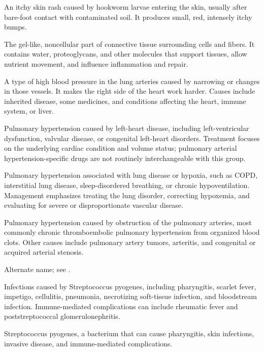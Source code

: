  An itchy skin rash caused by hookworm larvae entering the skin, usually after bare-foot contact with contaminated soil. It produces small, red, intensely itchy bumps.

 The gel-like, noncellular part of connective tissue surrounding cells and fibers. It contains water, proteoglycans, and other molecules that support tissues, allow nutrient movement, and influence inflammation and repair.

 A type of high blood pressure in the lung arteries caused by narrowing or changes in those vessels. It makes the right side of the heart work harder. Causes include inherited disease, some medicines, and conditions affecting the heart, immune system, or liver.

 Pulmonary hypertension caused by left-heart disease, including left-ventricular dysfunction, valvular disease, or congenital left-heart disorders. Treatment focuses on the underlying cardiac condition and volume status; pulmonary arterial hypertension-specific drugs are not routinely interchangeable with this group.

 Pulmonary hypertension associated with lung disease or hypoxia, such as COPD, interstitial lung disease, sleep-disordered breathing, or chronic hypoventilation. Management emphasizes treating the lung disorder, correcting hypoxemia, and evaluating for severe or disproportionate vascular disease.

 Pulmonary hypertension caused by obstruction of the pulmonary arteries, most commonly chronic thromboembolic pulmonary hypertension from organized blood clots. Other causes include pulmonary artery tumors, arteritis, and congenital or acquired arterial stenosis.

 Alternate name; see .

 Infections caused by Streptococcus pyogenes, including pharyngitis, scarlet fever, impetigo, cellulitis, pneumonia, necrotizing soft-tissue infection, and bloodstream infection. Immune-mediated complications can include rheumatic fever and poststreptococcal glomerulonephritis.

 Streptococcus pyogenes, a bacterium that can cause pharyngitis, skin infections, invasive disease, and immune-mediated complications.

